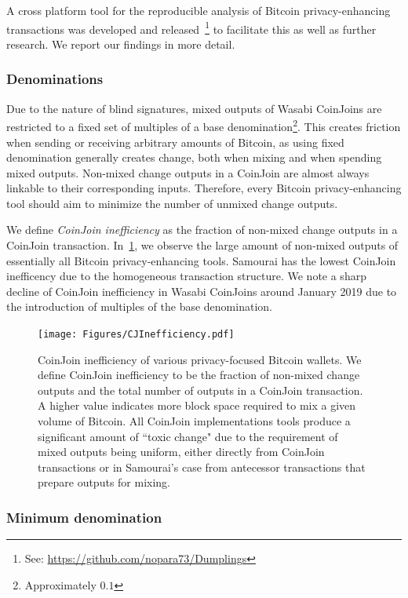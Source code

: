 \documentclass[a4paper]{article}
\def\bitcoinA{%
  \leavevmode
  \vtop{\offinterlineskip %
    \setbox0=\hbox{B}%
    \setbox2=\hbox to\wd0{\hfil\hskip-.03em
    \vrule height .3ex width .15ex\hskip .08em
    \vrule height .3ex width .15ex\hfil}
    \vbox{\copy2\box0}\box2}}
\def\bitcoinA{%
  \leavevmode
  \vtop{\offinterlineskip %
    \setbox0=\hbox{B}%
    \setbox2=\hbox to\wd0{\hfil\hskip-.03em
    \vrule height .3ex width .15ex\hskip .08em
    \vrule height .3ex width .15ex\hfil}
    \vbox{\copy2\box0}\box2}}
\begin{document}
A cross platform tool for the reproducible analysis of Bitcoin privacy-enhancing transactions was developed and released~\footnote{See: \url{https://github.com/nopara73/Dumplings}} to facilitate this as well as further research. We report our findings in more detail.

\subsubsection{Denominations}

Due to the nature of blind signatures, mixed outputs of Wasabi CoinJoins are restricted to a fixed set of multiples of a base denomination\footnote{Approximately $0.1$\bitcoinA{}}. This creates friction when sending or receiving arbitrary amounts of Bitcoin, as using fixed denomination generally creates change, both when mixing and when spending mixed outputs. Non-mixed change outputs in a CoinJoin are almost always linkable to their corresponding inputs. Therefore, every Bitcoin privacy-enhancing tool should aim to minimize the number of unmixed change outputs.

We define \emph{CoinJoin inefficiency} as the fraction of non-mixed change outputs in a CoinJoin transaction. In~\cref{fig:cjinefficiency}, we observe the large amount of non-mixed outputs of essentially all Bitcoin privacy-enhancing tools. Samourai has the lowest CoinJoin inefficency due to the homogeneous transaction structure. We note a sharp decline of CoinJoin inefficiency in Wasabi CoinJoins around January 2019 due to the introduction of multiples of the base denomination.

\begin{figure}[h!]
    \centering
    \texttt{[image: Figures/CJInefficiency.pdf]}
    \caption{CoinJoin inefficiency of various privacy-focused Bitcoin wallets. We define CoinJoin inefficiency to be the fraction of non-mixed change outputs and the total number of outputs in a CoinJoin transaction. A higher value indicates more block space required to mix a given volume of Bitcoin. All CoinJoin implementations tools produce a significant amount of ``toxic change" due to the requirement of mixed outputs being uniform, either directly from CoinJoin transactions or in Samourai's case from antecessor transactions that prepare outputs for mixing.}
    \label{fig:cjinefficiency}
\end{figure}

\subsubsection{Minimum denomination}
\end{document}
